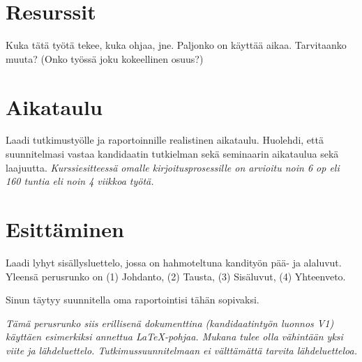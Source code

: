 \documentclass[12pt,a4paper,finnish,oneside]{article}
\begin{document}
\section{Resurssit}

Kuka tätä työtä tekee, kuka ohjaa, jne. Paljonko on käyttää
aikaa. Tarvitaanko muuta? (Onko työssä joku kokeellinen osuus?)

\section{Aikataulu}

Laadi tutkimustyölle ja raportoinnille realistinen aikataulu.
Huolehdi, että suunnitelmasi vastaa kandidaatin tutkielman sekä
seminaarin aikataulua sekä laajuutta.  \emph{Kurssiesitteessä omalle
  kirjoitusprosessille on arvioitu noin 6 op eli 160 tuntia eli noin 4
  viikkoa työtä.}



\section{Esittäminen}

Laadi lyhyt sisällysluettelo, jossa on hahmoteltuna kandityön pää- ja
alaluvut. Yleensä perusrunko on
(1) Johdanto,
(2) Tausta,
(3) Sisäluvut,
(4) Yhteenveto.

Sinun täytyy suunnitella oma raportointisi tähän sopivaksi.

\emph{Tämä perusrunko siis erillisenä dokumenttina (kandidaatintyön
  luonnos V1) käyttäen esimerkiksi annettua \LaTeX{}-pohjaa.  Mukana
  tulee olla vähintään yksi viite ja
  lähdeluettelo. Tutkimussuunnitelmaan ei välttämättä tarvita
  lähdeluetteloa.}

%


% 

\renewcommand{\refname}{Lähteet}  %



\end{document}
